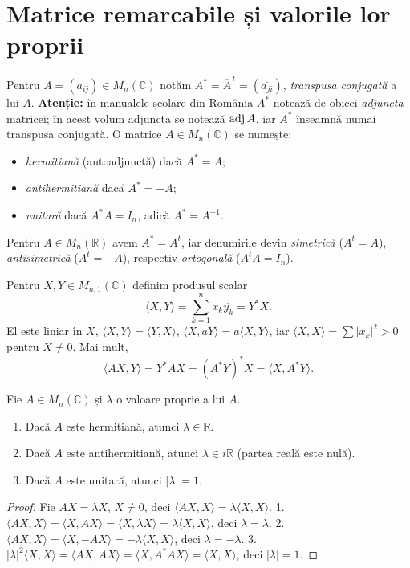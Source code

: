 \section{Matrice remarcabile și valorile lor proprii}\label{sec:remarcabile}

Pentru $A=(a_{ij})\in M_n(\mathbb{C})$ notăm $A^*=\overline{A}^{\,t}=(\overline{a_{ji}})$, \emph{transpusa conjugată} a lui $A$. \textbf{Atenție:} în manualele școlare din România $A^*$ notează de obicei \emph{adjuncta} matricei; în acest volum adjuncta se notează $\operatorname{adj} A$, iar $A^*$ înseamnă numai transpusa conjugată. O matrice $A\in M_n(\mathbb{C})$ se numește:
\begin{itemize}
\item \emph{hermitiană} (autoadjunctă) dacă $A^*=A$;
\item \emph{antihermitiană} dacă $A^*=-A$;
\item \emph{unitară} dacă $A^*A=I_n$, adică $A^*=A^{-1}$.
\end{itemize}
Pentru $A\in M_n(\mathbb{R})$ avem $A^*=A^t$, iar denumirile devin \emph{simetrică} ($A^t=A$), \emph{antisimetrică} ($A^t=-A$), respectiv \emph{ortogonală} ($A^tA=I_n$).

Pentru $X,Y\in M_{n,1}(\mathbb{C})$ definim produsul scalar
\[
\langle X,Y\rangle=\sum_{k=1}^nx_k\overline{y_k}=Y^*X .
\]
El este liniar în $X$, $\langle X,Y\rangle=\overline{\langle Y,X\rangle}$, $\langle X,aY\rangle=\overline a\langle X,Y\rangle$, iar $\langle X,X\rangle=\sum|x_k|^2>0$ pentru $X\neq0$. Mai mult,
\[
\langle AX,Y\rangle=Y^*AX=(A^*Y)^*X=\langle X,A^*Y\rangle .
\]

\begin{propozitie}\label{prop:remarcabile}
Fie $A\in M_n(\mathbb{C})$ și $\lambda$ o valoare proprie a lui $A$.
\begin{enumerate}
\item Dacă $A$ este hermitiană, atunci $\lambda\in\mathbb{R}$.
\item Dacă $A$ este antihermitiană, atunci $\lambda\in i\mathbb{R}$ (partea reală este nulă).
\item Dacă $A$ este unitară, atunci $|\lambda|=1$.
\end{enumerate}
\end{propozitie}

\begin{proof}
Fie $AX=\lambda X$, $X\neq0$, deci $\langle AX,X\rangle=\lambda\langle X,X\rangle$.
1. $\langle AX,X\rangle=\langle X,AX\rangle=\langle X,\lambda X\rangle=\overline\lambda\langle X,X\rangle$, deci $\lambda=\overline\lambda$.
2. $\langle AX,X\rangle=\langle X,-AX\rangle=-\overline\lambda\langle X,X\rangle$, deci $\lambda=-\overline\lambda$.
3. $|\lambda|^2\langle X,X\rangle=\langle AX,AX\rangle=\langle X,A^*AX\rangle=\langle X,X\rangle$, deci $|\lambda|=1$.
\end{proof}

